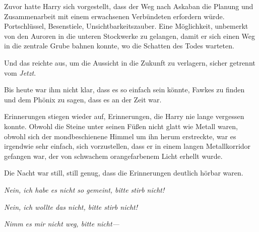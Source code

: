 Zuvor hatte Harry sich vorgestellt, dass der Weg nach Askaban die Planung und Zusammenarbeit mit einem erwachsenen Verbündeten erfordern würde. Portschlüssel, Besenstiele, Unsichtbarkeitszauber. Eine Möglichkeit, unbemerkt von den Auroren in die unteren Stockwerke zu gelangen, damit er sich einen Weg in die zentrale Grube bahnen konnte, wo die Schatten des Todes warteten.

Und das reichte aus, um die Aussicht in die Zukunft zu verlagern, sicher getrennt vom \emph{Jetzt}.

Bis heute war ihm nicht klar, dass es so einfach sein könnte, Fawkes zu finden und dem Phönix zu sagen, dass es an der Zeit war.

Erinnerungen stiegen wieder auf, Erinnerungen, die Harry nie lange vergessen konnte. Obwohl die Steine unter seinen Füßen nicht glatt wie Metall waren, obwohl sich der mondbeschienene Himmel um ihn herum erstreckte, war es irgendwie sehr einfach, sich vorzustellen, dass er in einem langen Metallkorridor gefangen war, der von schwachem orangefarbenem Licht erhellt wurde.

Die Nacht war still, still genug, dass die Erinnerungen deutlich hörbar waren.

\emph{Nein, ich habe es nicht so gemeint, bitte stirb nicht!}

\emph{Nein, ich wollte das nicht, bitte stirb nicht!}

\emph{Nimm es mir nicht weg, bitte nicht—}

